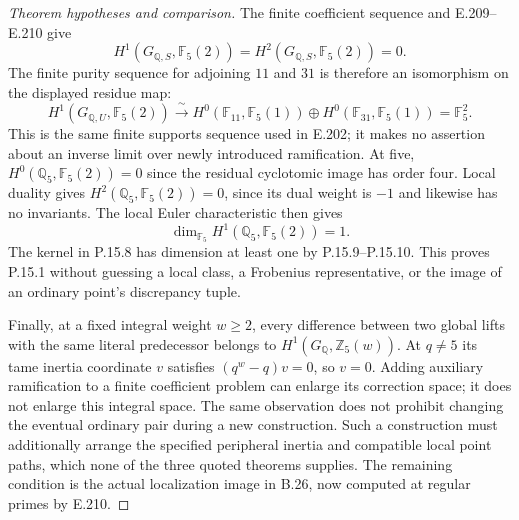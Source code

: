 \begin{proof}[Theorem hypotheses and comparison]
The finite coefficient sequence and E.209--E.210 give
\[
 H^1(G_{\mathbb Q,S},\mathbb F_5(2))=
 H^2(G_{\mathbb Q,S},\mathbb F_5(2))=0.
\]
The finite purity sequence for adjoining $11$ and $31$ is
therefore an isomorphism on the displayed residue map:
\[
 H^1(G_{\mathbb Q,U},\mathbb F_5(2))
    \xrightarrow{\ \sim\ }
 H^0(\mathbb F_{11},\mathbb F_5(1))
       \oplus H^0(\mathbb F_{31},\mathbb F_5(1))
    =\mathbb F_5^2.                                           \tag{P.15.9}
\]
This is the same finite supports sequence used in E.202;
it makes no assertion about an inverse limit over newly
introduced ramification.
At five, $H^0(\mathbb Q_5,\mathbb F_5(2))=0$ since the
residual cyclotomic image has order four. Local duality gives
$H^2(\mathbb Q_5,\mathbb F_5(2))=0$, since its dual weight
is $-1$ and likewise has no invariants. The local Euler
characteristic then gives
\[
           \dim_{\mathbb F_5}H^1(\mathbb Q_5,\mathbb F_5(2))=1.
                                                               \tag{P.15.10}
\]
The kernel in P.15.8 has dimension at least one by
P.15.9--P.15.10. This proves P.15.1 without guessing a
local class, a Frobenius representative, or the image of an
ordinary point's discrepancy tuple.

Finally, at a fixed integral weight $w\ge2$, every difference
between two global lifts with the same literal predecessor
belongs to $H^1(G_{\mathbb Q},\mathbb Z_5(w))$.
At $q\ne5$ its tame inertia coordinate $v$ satisfies
$(q^w-q)v=0$, so $v=0$. Adding auxiliary ramification to a
finite coefficient problem can enlarge its correction space;
it does not enlarge this integral space. The same observation
does not prohibit changing the eventual ordinary pair during a
new construction. Such a construction must additionally arrange
the specified peripheral inertia and compatible local point
paths, which none of the three quoted theorems supplies.
The remaining condition is the actual localization image in
B.26, now computed at regular primes by E.210.
\end{proof}

